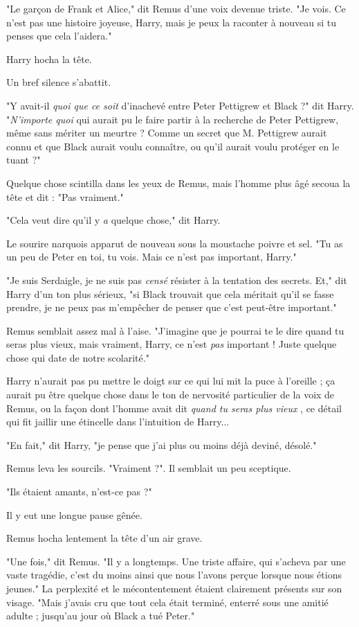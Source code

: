 "Le garçon de Frank et Alice," dit Remus d'une voix devenue triste. "Je vois. Ce n'est pas une histoire joyeuse, Harry, mais je peux la raconter à nouveau si tu penses que cela l'aidera."

Harry hocha la tête.

Un bref silence s'abattit.

"Y avait-il \emph{quoi que ce soit}  d'inachevé entre Peter Pettigrew et Black ?" dit Harry. "\emph{N'importe quoi}  qui aurait pu le faire partir à la recherche de Peter Pettigrew, même sans mériter un meurtre ? Comme un secret que M. Pettigrew aurait connu et que Black aurait voulu connaître, ou qu'il aurait voulu protéger en le tuant ?"

Quelque chose scintilla dans les yeux de Remus, mais l'homme plus âgé secoua la tête et dit : "Pas vraiment."

"Cela veut dire qu'il y \emph{a}  quelque chose," dit Harry.

Le sourire narquois apparut de nouveau sous la moustache poivre et sel. "Tu as un peu de Peter en toi, tu vois. Mais ce n'est pas important, Harry."

"Je suis Serdaigle, je ne suis pas \emph{censé}  résister à la tentation des secrets. Et," dit Harry d'un ton plus sérieux, "si Black trouvait que cela méritait qu'il se fasse prendre, je ne peux pas m'empêcher de penser que c'est peut-être important."

Remus semblait assez mal à l'aise. "J'imagine que je pourrai te le dire quand tu seras plus vieux, mais vraiment, Harry, ce n'est \emph{pas}  important ! Juste quelque chose qui date de notre scolarité."

Harry n'aurait pas pu mettre le doigt sur ce qui lui mit la puce à l'oreille ; ça aurait pu être quelque chose dans le ton de nervosité particulier de la voix de Remus, ou la façon dont l'homme avait dit \emph{quand tu seras plus vieux} , ce détail qui fit jaillir une étincelle dans l'intuition de Harry...

"En fait," dit Harry, "je pense que j'ai plus ou moins déjà deviné, désolé."

Remus leva les sourcils. "Vraiment ?". Il semblait un peu sceptique.

"Ils étaient amants, n'est-ce pas ?"

Il y eut une longue pause gênée.

Remus hocha lentement la tête d'un air grave.

"Une fois," dit Remus. "Il y a longtemps. Une triste affaire, qui s'acheva par une vaste tragédie, c'est du moins ainsi que nous l'avons perçue lorsque nous étions jeunes." La perplexité et le mécontentement étaient clairement présents sur son visage. "Mais j'avais cru que tout cela était terminé, enterré sous une amitié adulte ; jusqu'au jour où Black a tué Peter."

